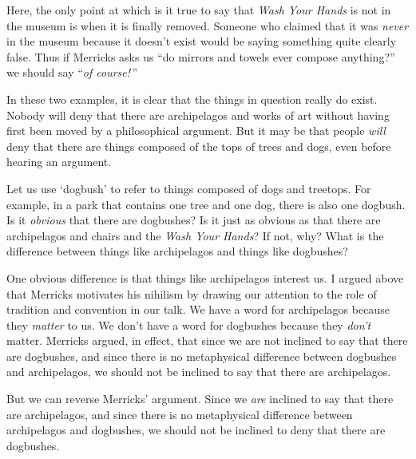 \documentclass[12pt,twoside]{reedfancy}
\begin{document}
\begin{spacing}{1.25}
Here, the only point at which is it true to say that {\em Wash Your
  Hands} is not in the museum is when it is finally removed.  Someone
who claimed that it was {\em never} in the museum because it doesn't
exist would be saying something quite clearly false.  Thus if Merricks
asks us ``do mirrors and towels ever compose anything?'' we should say
``{\em of course!}\,''

In these two examples, it is clear that the things in question really
do exist.  Nobody will deny that there are archipelagos and works of
art without having first been moved by a philosophical argument.  But
it may be that people {\em will} deny that there are things composed
of the tops of trees and dogs, even before hearing an argument.

Let us use `dogbush' to refer to things composed of dogs and treetops.
For example, in a park that contains one tree and one dog, there is
also one dogbush.  Is it {\em obvious} that there are dogbushes?  Is
it just as obvious as that there are archipelagos and chairs and the
{\em Wash Your Hands}?  If not, why?  What is the difference between
things like archipelagos and things like dogbushes?

One obvious difference is that things like archipelagos interest us.
I argued above that Merricks motivates his nihilism by drawing our
attention to the role of tradition and convention in our talk.  We
have a word for archipelagos because they {\em matter} to us.  We
don't have a word for dogbushes because they {\em don't} matter.
Merricks argued, in effect, that since we are not inclined to say that
there are dogbushes, and since there is no metaphysical difference
between dogbushes and archipelagos, we should not be inclined to say
that there are archipelagos.

But we can reverse Merricks' argument.  Since we {\em are} inclined to
say that there are archipelagos, and since there is no metaphysical
difference between archipelagos and dogbushes, we should not be
inclined to deny that there are dogbushes.


\end{spacing}
\end{document}
